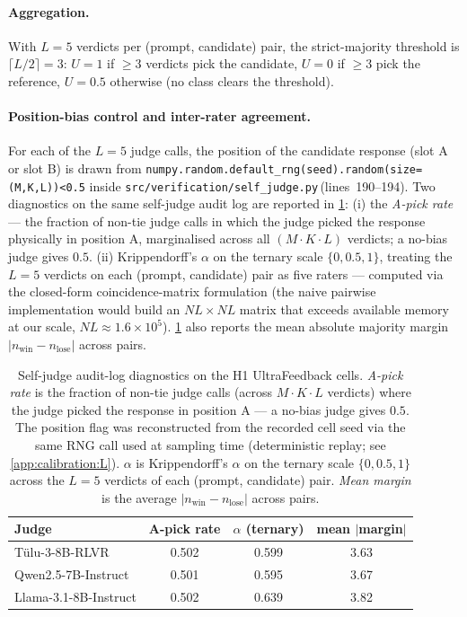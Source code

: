 \paragraph{Aggregation.}
With $L{=}5$ verdicts per (prompt, candidate) pair, the strict-majority
threshold is $\lceil L/2 \rceil = 3$: $U = 1$ if $\geq 3$ verdicts pick
the candidate, $U=0$ if $\geq 3$ pick the reference, $U=0.5$ otherwise
(no class clears the threshold).

\paragraph{Position-bias control and inter-rater agreement.}
For each of the $L=5$ judge calls, the position of the candidate
response (slot A or slot B) is drawn from
\texttt{numpy.random.default\_rng(seed).random(size{=}(M,K,L))<0.5}
inside
\texttt{src/verification/self\_judge.py}\,(lines~190--194).
Two diagnostics on the same self-judge audit log are reported in
\cref{tab:appendix_position_bias}: (i) the \emph{A-pick rate} —
the fraction of non-tie judge calls in which the judge picked the
response physically in position A, marginalised across all
$(M\cdot K\cdot L)$ verdicts; a no-bias judge gives $0.5$. (ii)
Krippendorff's $\alpha$ on the ternary scale $\{0,0.5,1\}$,
treating the $L=5$ verdicts on each (prompt, candidate) pair as
five raters — computed via the closed-form coincidence-matrix
formulation (the naive pairwise implementation would build an
$NL\times NL$ matrix that exceeds available memory at our scale,
$NL\approx 1.6\times10^5$).
\cref{tab:appendix_position_bias} also reports the mean absolute
majority margin $|n_{\text{win}}{-}n_{\text{lose}}|$ across pairs.

\begin{table}[htbp]
\centering
\small
\caption{Self-judge audit-log diagnostics on the H1 UltraFeedback cells. \emph{A-pick rate} is the fraction of non-tie judge calls (across $M\cdot K\cdot L$ verdicts) where the judge picked the response in position A — a no-bias judge gives $0.5$. The position flag was reconstructed from the recorded cell seed via the same RNG call used at sampling time (deterministic replay; see \cref{app:calibration:L}). $\alpha$ is Krippendorff's $\alpha$ on the ternary scale $\{0,0.5,1\}$ across the $L{=}5$ verdicts of each (prompt, candidate) pair. \emph{Mean margin} is the average $|n_{\text{win}} - n_{\text{lose}}|$ across pairs.}
\label{tab:appendix_position_bias}
\begin{tabular}{lccc}
\toprule
Judge & A-pick rate & $\alpha$ (ternary) & mean $|$margin$|$ \\
\midrule
Tülu-3-8B-RLVR & 0.502 & 0.599 & 3.63 \\  %
Qwen2.5-7B-Instruct & 0.501 & 0.595 & 3.67 \\  %
Llama-3.1-8B-Instruct & 0.502 & 0.639 & 3.82 \\  %
\bottomrule
\end{tabular}
\end{table}


